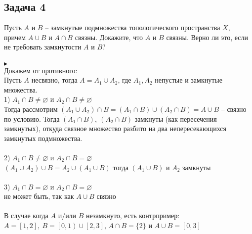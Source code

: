 \begin{comment}
			\\
			Теперь вернемся к задаче. Требуется доказать, что $\Gamma$ -- ретракт в $X \times Y$. Рассмотрим непрерывное отображение $\varphi:\ \Gamma \to Z$. Тогда композиция $g = \phi \circ h_{f} \circ p:\ X \times Y \to Z$, где $h_{f}: X \to$ $\Gamma$ -- гомеоморфизм $(x \mapsto f(x)) \Rightarrow$ взаимнооднозначно, компоненты отображения $h_{f}$ -- непрерывные отображения $\text{Id}: X \to X, \quad y = f(x) \Rightarrow h_{f}$ непрерывно, $h^{-1}_{f}:\ F \to X$ -- сужение проекции $p: X \times Y \to X$, на подпространстве $\Gamma$ совпадает с $\varphi. \quad \blacktriangleleft$\\
		\end{comment}
		
		
		
		\subsection*{Задача 4}
		Пусть $A$ и $B$ -- замкнутые подмножества топологического пространства $X$, причем $A \cup B$ и $A \cap B$ связны. Докажите, что $A$ и $B$ связны. Верно ли это, если не требовать замкнутости $A$ и $B?$\\
		\\
		$\blacktriangleright$\\
		Докажем от противного:\\
		Пусть $A$ несвязно, тогда $A = A_1 \cup A_2$, где $A_1, A_2$ непустые и замкнутые множества.\\
		1) $A_1 \cap B \ne \varnothing$ и $A_2 \cap B \ne \varnothing$\\
		Тогда рассмотрим $(A_1 \cup A_2) \cap B = (A_1 \cap B) \cup (A_2 \cap B) = A \cup B$ -- связно по условию. Тогда $(A_1 \cap B),\ (A_2 \cap B)$ замкнуты (как пересечения замкнутых), откуда связное множество разбито на два непересекающихся замкнутых подмножества.\\
		\\
		2) $A_1 \cap B \ne \varnothing$ и $A_2 \cap B = \varnothing$\\
		$(A_1 \cup A_2) \cup B = A_2 \cup (A_1 \cup B)$ тогда $(A_1 \cup B)$ и $A_2$ замкнуты\\
		\\
		3) $A_1 \cap B = \varnothing$ и $A_2 \cap B = \varnothing$\\
		не может быть, так как $A \cup B$ связно\\
		\\
		В случае когда $A$ и$\slash$или $B$ незамкнуто, есть контрпример: $A = [1, 2],\ B = \left[0, 1\right) \cup \left[2, 3\right]$, $A \cap B = \{2\}$ и $A \cup B = [0, 3]$\\
		
